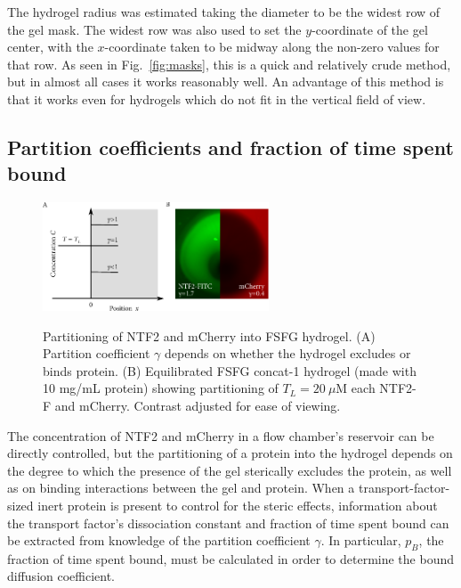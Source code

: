 The hydrogel radius was estimated taking the diameter to be the widest row of the gel mask.  The widest row was also used to set the $y$-coordinate of the gel center, with the $x$-coordinate taken to be midway along the non-zero values for that row.  As seen in Fig.~\ref{fig:masks}, this is a quick and relatively crude method, but in almost all cases it works reasonably well.  An advantage of this method is that it works even for hydrogels which do not fit in the vertical field of view.

\subsection{Partition coefficients and fraction of time spent bound}
\label{sec:part-coeff}

\begin{figure} 
\caption[Partitioning of NTF2 and mCherry into FSFG hydrogel.]{Partitioning of NTF2 and mCherry into FSFG hydrogel.  (A) Partition coefficient $\gamma$ depends on whether the hydrogel excludes or binds protein. (B) Equilibrated FSFG concat-1 hydrogel (made with 10 mg/mL protein) showing partitioning of $T_L = 20\ \mu$M each NTF2-F and mCherry.  Contrast adjusted for ease of viewing.}
\centering
\includegraphics[width=0.6\textwidth]{figs/ch04/partition.pdf}
\label{fig:partition}
\end{figure}

The concentration of NTF2 and mCherry in a flow chamber's reservoir can be directly controlled, but the partitioning of a protein into the hydrogel depends on the degree to which the presence of the gel sterically excludes the protein, as well as on binding interactions between the gel and protein.  When a transport-factor-sized inert protein is present to control for the steric effects, information about the transport factor's dissociation constant and fraction of time spent bound can be extracted from knowledge of the partition coefficient $\gamma$.  In particular, $p_B$, the fraction of time spent bound, must be calculated in order to determine the bound diffusion coefficient.

